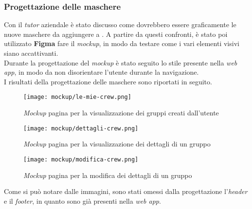 \subsubsection{Progettazione delle maschere}
Con il \textit{tutor} aziendale è stato discusso come dovrebbero essere graficamente le nuove maschere da aggiungere a \productName. A partire da questi confronti, è stato poi utilizzato \textbf{Figma} fare il \textit{mockup}, in modo da  testare come i vari elementi visivi siano accattivanti.\\
Durante la progettazione del \textit{mockup} è stato seguito lo stile presente nella \textit{web app}, in modo da non disorientare l'utente durante la navigazione. \\
I risultati della progettazione delle maschere sono riportati in seguito.
\begin{figure}[H] 
    \centerline{\texttt{[image: mockup/le-mie-crew.png]}} 
    \caption{\textit{Mockup} pagina per la visualizzazione dei gruppi creati dall'utente}
\end{figure}


\begin{figure}[H] 
    \centering 
    \texttt{[image: mockup/dettagli-crew.png]} 
    \caption{\textit{Mockup} pagina per la visualizzazione dei dettagli di un gruppo}
\end{figure}

\begin{figure}[H] 
    \centering 
    \texttt{[image: mockup/modifica-crew.png]} 
    \caption{\textit{Mockup} pagina per la modifica dei dettagli di un gruppo}
\end{figure}

Come si può notare dalle immagini, sono stati omessi dalla progettazione l'\textit{header} e il \textit{footer}, in quanto sono già presenti nella \textit{web app}.





